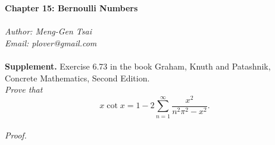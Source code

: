 \documentclass{article}
\begin{document}
\textbf{\Large Chapter 15: Bernoulli Numbers} \\\\



\emph{Author: Meng-Gen Tsai} \\
\emph{Email: plover@gmail.com} \\\\






\textbf{Supplement.} Exercise 6.73 in the book
Graham, Knuth and Patashnik, Concrete Mathematics, Second Edition. \\

\emph{Prove that $$x \cot x = 1 - 2 \sum_{n=1}^{\infty} \frac{x^2}{n^2 \pi^2 - x^2}.$$} \\

\emph{Proof.}
\end{document}
